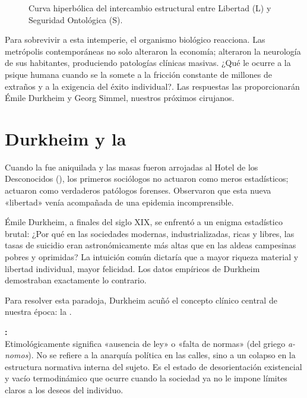 \begin{figure}[htbp]
    \centering
    
    \caption{Curva hiperbólica del intercambio estructural entre Libertad (L) y Seguridad Ontológica (S).}
    \label{fig:dilema_tonnies}
\end{figure}

Para sobrevivir a esta intemperie, el organismo biológico reacciona. Las metrópolis contemporáneas no solo alteraron la economía; alteraron la neurología de sus habitantes, produciendo patologías clínicas masivas. ¿Qué le ocurre a la psique humana cuando se la somete a la fricción constante de millones de extraños y a la exigencia del éxito individual?. Las respuestas las proporcionarán Émile Durkheim y Georg Simmel, nuestros próximos cirujanos.

\section{Durkheim y la \Anomia}

Cuando la \Gemeinschaft{} fue aniquilada y las masas fueron arrojadas al Hotel de los Desconocidos (\Gesellschaft), los primeros sociólogos no actuaron como meros estadísticos; actuaron como verdaderos patólogos forenses. Observaron que esta nueva «libertad» venía acompañada de una epidemia incomprensible. 

Émile Durkheim, a finales del siglo XIX, se enfrentó a un enigma estadístico brutal: ¿Por qué en las sociedades modernas, industrializadas, ricas y libres, las tasas de suicidio eran astronómicamente más altas que en las aldeas campesinas pobres y oprimidas? La intuición común dictaría que a mayor riqueza material y libertad individual, mayor felicidad. Los datos empíricos de Durkheim demostraban exactamente lo contrario.

Para resolver esta paradoja, Durkheim acuñó el concepto clínico central de nuestra época: la \textbf{\Anomia}.

\begin{definicion}
\textbf{\Anomia:}\\
Etimológicamente significa «ausencia de ley» o «falta de normas» (del griego \textit{a-nomos}). No se refiere a la anarquía política en las calles, sino a un colapso en la estructura normativa interna del sujeto. Es el estado de desorientación existencial y vacío termodinámico que ocurre cuando la sociedad ya no le impone límites claros a los deseos del individuo.
\end{definicion}

